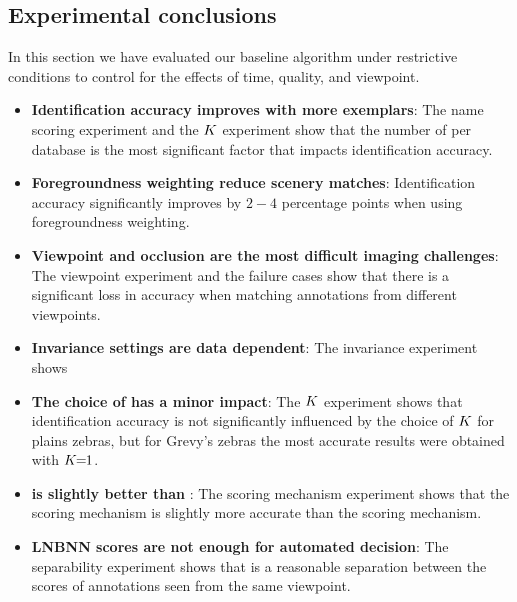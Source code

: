     \subsection{Experimental conclusions}
        In this section we have evaluated our baseline algorithm under restrictive conditions to control for the
          effects of time, quality, and viewpoint.
        \begin{itemize}
            \item \textbf{Identification accuracy improves with more exemplars}:
                The name scoring experiment and the $K$ experiment show that the number of \exemplars{} per database
                  \name{} is the most significant factor that impacts identification accuracy.
                
            \item \textbf{Foregroundness weighting reduce scenery matches}:
                Identification accuracy significantly improves by $2-4$ percentage points when using foregroundness
                  weighting.
                
            \item \textbf{Viewpoint and occlusion are the most difficult imaging challenges}:
                The viewpoint experiment and the failure cases show that there is a significant loss in accuracy when
                  matching annotations from different viewpoints.
                
            \item \textbf{Invariance settings are data dependent}:
                The invariance experiment shows
            \item \textbf{The choice of \K{} has a minor impact}: 
                The $K$ experiment shows that identification accuracy is not significantly influenced by the choice
                  of $K$ for plains zebras, but for Grevy's zebras the most accurate results were obtained with
                  $K\mkern-6mu=\mkern-6mu1$.
            \item \textbf{\Nsumprefix{} is slightly better than \csumprefix{} \namescoring{}}:
                The scoring mechanism experiment shows that the \nsumprefix{} scoring mechanism is slightly more
                  accurate than the \csumprefix{} scoring mechanism.
                
            \item \textbf{LNBNN scores are not enough for automated decision}:
                The separability experiment shows that is a reasonable separation between the scores of annotations
                  seen from the same viewpoint.
        \end{itemize}
        
